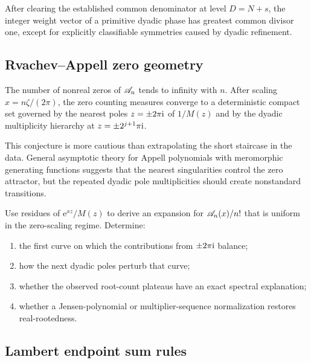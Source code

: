 \documentclass[11pt,oneside]{article}
\numberwithin{equation}{section}
\theoremstyle{definition}
\theoremstyle{remark}
\newcommand{\e}{\mathrm e}
\begin{document}
\begin{conjecture}
\label{p3:conj:primitive-rules}
After clearing the established common denominator at level $D=N+s$, the integer weight vector of a primitive dyadic phase has greatest common divisor one, except for explicitly classifiable symmetries caused by dyadic refinement.
\end{conjecture}

\subsection{Rvachev--Appell zero geometry}

\begin{conjecture}
\label{p3:conj:Appell-root-staircase}
The number of nonreal zeros of $\mathscr A_n$ tends to infinity with $n$.  After scaling $x=n\zeta/(2\pi)$, the zero counting measures converge to a deterministic compact set governed by the nearest poles $z=\pm2\pi\mathrm i$ of $1/M(z)$ and by the dyadic multiplicity hierarchy at $z=\pm2^{j+1}\pi\mathrm i$.
\end{conjecture}

This conjecture is more cautious than extrapolating the short staircase in the data.  General asymptotic theory for Appell polynomials with meromorphic generating functions suggests that the nearest singularities control the zero attractor, but the repeated dyadic pole multiplicities should create nonstandard transitions.

\begin{problem}
\label{p3:prob:Appell-spectral-asymptotic}
Use residues of $\e^{xz}/M(z)$ to derive an expansion for $\mathscr A_n(x)/n!$ that is uniform in the zero-scaling regime.  Determine:
\begin{enumerate}
\item the first curve on which the contributions from $\pm2\pi\mathrm i$ balance;
\item how the next dyadic poles perturb that curve;
\item whether the observed root-count plateaus have an exact spectral explanation;
\item whether a Jensen-polynomial or multiplier-sequence normalization restores real-rootedness.
\end{enumerate}
\end{problem}

\subsection{Lambert endpoint sum rules}
\end{document}
